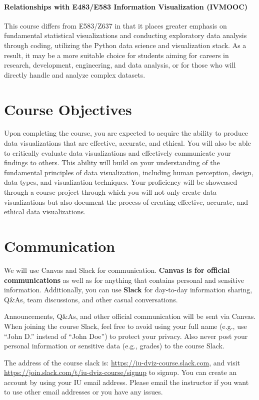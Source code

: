 \documentclass[11pt,article,oneside]{memoir} %
\begin{document}
\paragraph{Relationships with E483/E583 Information Visualization (IVMOOC)} This
course differs from E583/Z637 in that it places greater emphasis on fundamental
statistical visualizations and conducting exploratory data analysis through
coding, utilizing the Python data science and visualization stack. As a result,
it may be a more suitable choice for students aiming for careers in research,
development, engineering, and data analysis, or for those who will directly
handle and analyze complex datasets.

\section{Course Objectives}%

Upon completing the course, you are expected to acquire the ability to produce
data visualizations that are effective, accurate, and ethical.  You will also
be able to critically evaluate data visualizations and effectively communicate
your findings to others.  This ability will build on your understanding of the
fundamental principles of data visualization, including human perception,
design, data types, and visualization techniques.  Your proficiency will be
showcased through a course project through which you will not only create data
visualizations but also document the process of creating effective, accurate,
and ethical data visualizations.

\section{Communication} %

We will use Canvas and Slack for communication. \textbf{Canvas is for official communications} as well as for anything that contains personal and sensitive information. Additionally, you can use \textbf{Slack} for day-to-day information sharing, Q\&As, team discussions, and other casual conversations. 

Announcements, Q\&As, and other official communication will be sent via Canvas. When joining the course Slack, feel free to avoid using your full name (e.g., use ``John D.'' instead of ``John Doe'') to protect your privacy. 
Also never post your personal information or sensitive data (e.g., grades) to the course Slack. 

The address of the course slack is: \url{https://iu-dviz-course.slack.com}, and visit \url{https://join.slack.com/t/iu-dviz-course/signup} to signup.
You can create an account by using your IU email address. Please email the instructor if you want to use other email addresses or you have any issues.
\end{document}
